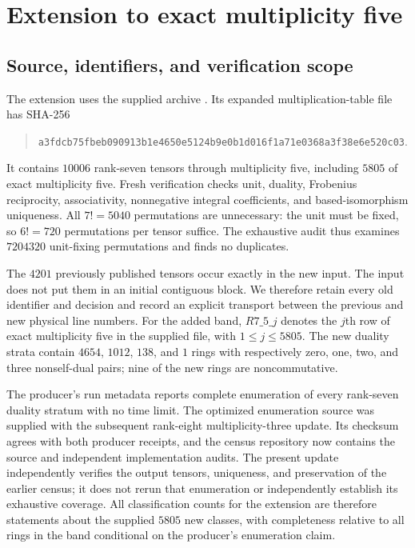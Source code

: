 \section{Extension to exact multiplicity five}
\label{sec:m5-extension}
\subsection{Source, identifiers, and verification scope}
The extension uses the supplied archive
. Its expanded multiplication-table
file has SHA-256
\begin{quote}\small\ttfamily
\nolinkurl{a3fdcb75fbeb090913b1e4650e5124b9e0b1d016f1a71e0368a3f38e6e520c03}.
\end{quote}
It contains $10006$ rank-seven tensors through multiplicity five,
including $5805$ of exact multiplicity five. Fresh verification checks
unit, duality, Frobenius reciprocity, associativity, nonnegative integral
coefficients, and based-isomorphism uniqueness. All $7!=5040$
permutations are unnecessary: the unit must be fixed, so $6!=720$
permutations per tensor suffice. The exhaustive audit thus examines
$7204320$ unit-fixing permutations and finds no duplicates.

The $4201$ previously published tensors occur exactly in the new input.
The input does not put them in an initial contiguous block. We therefore
retain every old identifier and decision and record an explicit transport
between the previous and new physical line numbers. For the added band,
$R7\_5\_j$ denotes the $j$th row of exact multiplicity five in the supplied
file, with $1\leq j\leq5805$.
The new duality strata contain $4654$, $1012$, $138$, and $1$ rings with
respectively zero, one, two, and three nonself-dual pairs; nine of the new
rings are noncommutative.

The producer's run metadata reports complete enumeration of every
rank-seven duality stratum with no time limit. The optimized enumeration
source was supplied with the subsequent rank-eight multiplicity-three
update. Its checksum agrees with both producer receipts, and the census
repository now contains the source and independent implementation audits.
The present update independently verifies the output tensors, uniqueness,
and preservation of the earlier census; it does not rerun that enumeration
or independently establish its exhaustive coverage. All classification
counts for the extension are therefore statements about the supplied
$5805$ new classes, with completeness relative to all rings in the band
conditional on the producer's enumeration claim.

